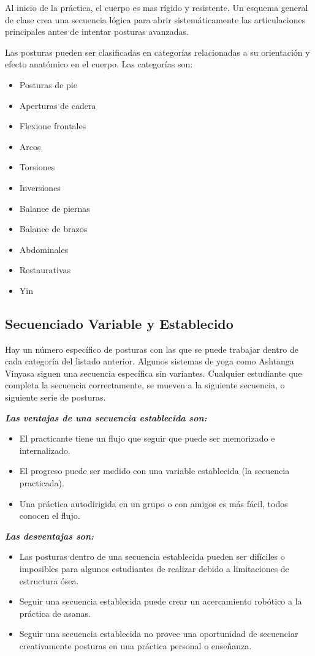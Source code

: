 Al inicio de la práctica, el cuerpo es mas rígido y resistente. Un esquema general de clase crea una secuencia lógica para abrir sistemáticamente las articulaciones principales antes de intentar posturas avanzadas.

Las posturas pueden ser clasificadas en categorías relacionadas a su orientación y efecto anatómico en el cuerpo. Las categorías son:

\begin{itemize}
	\item Posturas de pie
	\item Aperturas de cadera
	\item Flexione frontales
	\item Arcos
	\item Torsiones
	\item Inversiones
	\item Balance de piernas
	\item Balance de brazos
	\item Abdominales
	\item Restaurativas
	\item Yin
\end{itemize}

\subsection{Secuenciado Variable y Establecido}
Hay un número específico de posturas con las que se puede trabajar dentro de cada categoría del listado anterior. Algunos sistemas de yoga como Ashtanga Vinyasa siguen una secuencia específica sin variantes. Cualquier estudiante que completa la secuencia correctamente, se mueven a la siguiente secuencia, o siguiente serie de posturas.

\textbf{\textit{Las ventajas de una secuencia establecida son:}}
\begin{itemize}
	\item El practicante tiene un flujo que seguir que puede ser memorizado e internalizado.
	\item El progreso puede ser medido con una variable establecida (la secuencia practicada).
	\item Una práctica autodirigida en un grupo o con amigos es más fácil, todos conocen el flujo.
\end{itemize}

\textbf{\textit{Las desventajas son:}}
\begin{itemize}
	\item Las posturas dentro de una secuencia establecida pueden ser difíciles o imposibles para algunos estudiantes de realizar debido a limitaciones de estructura ósea.
	\item Seguir una secuencia establecida puede crear un acercamiento robótico a la práctica de asanas.
	\item Seguir una secuencia establecida no provee una oportunidad de secuenciar creativamente posturas en una práctica personal o enseñanza.
\end{itemize}

